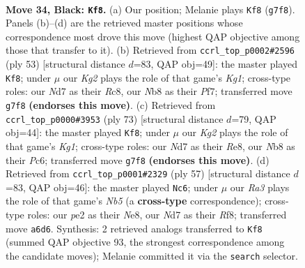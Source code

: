 \documentclass[11pt]{article}
\begin{document}
\clearpage

\begin{figure}[p]\centering
\begin{subfigure}{0.46\textwidth}\centering
\resizebox{\linewidth}{!}{%
\newchessgame
\chessboard[
  setfen={1nb5/1p1n2k1/r4p2/pN1p2p1/1b4Pp/1P2P2P/PB2PK2/1R1B4 b - - 3 34},
  showmover=false,
  pgfstyle=straightmove, color=movearrow, markmove={g7-f8}
]}
\caption{}
\end{subfigure}\hfill
\begin{subfigure}{0.46\textwidth}\centering
\resizebox{\linewidth}{!}{%
\newchessgame
\chessboard[
  setfen={2r3k1/5p2/1npb2p1/4p2p/p3P3/4NP2/PPR1BP1P/6K1 b - - 2 27},
  showmover=false,
  pgfstyle=straightmove, color=movearrow, markmove={g8-f8}
]}
\caption{}
\end{subfigure}
\\[4pt]
\begin{subfigure}{0.46\textwidth}\centering
\resizebox{\linewidth}{!}{%
\newchessgame
\chessboard[
  setfen={4r1k1/5p2/2pb1np1/p3p2p/8/1PP3PP/PBB1RPK1/8 b - - 1 37},
  showmover=false,
  pgfstyle=straightmove, color=movearrow, markmove={g8-f8}
]}
\caption{}
\end{subfigure}\hfill
\begin{subfigure}{0.46\textwidth}\centering
\resizebox{\linewidth}{!}{%
\newchessgame
\chessboard[
  setfen={4nrk1/1p3pp1/pB2p2p/P3P3/Nn6/8/1P1bB1PP/5R1K b - - 0 29},
  showmover=false,
  pgfstyle=straightmove, color=movearrow, markmove={b4-c6}
]}
\caption{}
\end{subfigure}
\caption{\textbf{Move 34, Black: \texttt{Kf8}.} (a) Our position; Melanie plays \texttt{Kf8} (\texttt{g7f8}). Panels (b)--(d) are the retrieved master positions whose correspondence most drove this move (highest QAP objective among those that transfer to it). (b) Retrieved from \texttt{ccrl\_top\_p0002\#2596} (ply 53) [structural distance $d$=83, QAP obj=49]: the master played \texttt{Kf8}; under $\mu$ our \emph{Kg2} plays the role of that game's \emph{Kg1}; cross-type roles: our \emph{N}d7 as their \emph{R}c8, our \emph{N}b8 as their \emph{P}f7; transferred move \texttt{g7f8} \textbf{(endorses this move)}. (c) Retrieved from \texttt{ccrl\_top\_p0000\#3953} (ply 73) [structural distance $d$=79, QAP obj=44]: the master played \texttt{Kf8}; under $\mu$ our \emph{Kg2} plays the role of that game's \emph{Kg1}; cross-type roles: our \emph{N}d7 as their \emph{R}e8, our \emph{N}b8 as their \emph{P}c6; transferred move \texttt{g7f8} \textbf{(endorses this move)}. (d) Retrieved from \texttt{ccrl\_top\_p0001\#2329} (ply 57) [structural distance $d$=83, QAP obj=46]: the master played \texttt{Nc6}; under $\mu$ our \emph{Ra3} plays the role of that game's \emph{Nb5} (a \textbf{cross-type} correspondence); cross-type roles: our \emph{p}e2 as their \emph{N}e8, our \emph{N}d7 as their \emph{R}f8; transferred move \texttt{a6d6}. Synthesis: 2 retrieved analogs transferred to \texttt{Kf8} (summed QAP objective 93, the strongest correspondence among the candidate moves); Melanie committed it via the \texttt{search} selector.}
\label{fig:thought-m67}
\end{figure}
\end{document}
